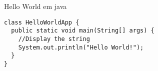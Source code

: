 \begin{algocf}
  \caption{Hello World em java}
  \begin{lstlisting}
class HelloWorldApp {
  public static void main(String[] args) {
    //Display the string
    System.out.println("Hello World!");
  }
}
\end{lstlisting}
\label{alg:hello}
\end{algocf}